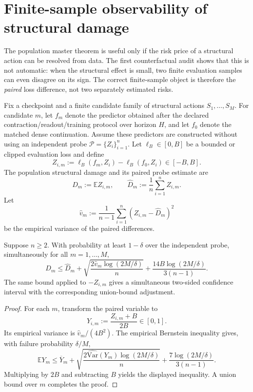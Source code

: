 \section{Finite-sample observability of structural damage}
The population master theorem is useful only if the risk price of a structural action can be resolved from data. The first counterfactual audit shows that this is not automatic: when the structural effect is small, two finite evaluation samples can even disagree on its sign. The correct finite-sample object is therefore the \emph{paired} loss difference, not two separately estimated risks.

Fix a checkpoint and a finite candidate family of structural actions $S_1,\ldots,S_M$. For candidate $m$, let $f_m$ denote the predictor obtained after the declared contraction/readout/training protocol over horizon $H$, and let $f_0$ denote the matched dense continuation. Assume these predictors are constructed without using an independent probe $\mathcal P=\{Z_i\}_{i=1}^n$. Let $\ell_B\in[0,B]$ be a bounded or clipped evaluation loss and define
\[
Z_{i,m}:=\ell_B(f_m,Z_i)-\ell_B(f_0,Z_i)\in[-B,B].
\]
The population structural damage and its paired probe estimate are
\[
D_m:=\mathbb E Z_{i,m},
\qquad
\widehat D_m:=\frac1n\sum_{i=1}^n Z_{i,m}.
\]
Let
\[
\widehat v_m:=\frac1{n-1}\sum_{i=1}^n(Z_{i,m}-\widehat D_m)^2
\]
be the empirical variance of the paired differences.

\begin{theorem}\label{thm:paired-damage}
Suppose $n\ge2$. With probability at least $1-\delta$ over the independent probe, simultaneously for all $m=1,\ldots,M$,
\[
\boxed{
D_m
\le
\widehat D_m
+
\sqrt{\frac{2\widehat v_m\log(2M/\delta)}{n}}
+
\frac{14B\log(2M/\delta)}{3(n-1)}.
}
\]
The same bound applied to $-Z_{i,m}$ gives a simultaneous two-sided confidence interval with the corresponding union-bound adjustment.
\end{theorem}

\begin{proof}
For each $m$, transform the paired variable to
\[
Y_{i,m}:=\frac{Z_{i,m}+B}{2B}\in[0,1].
\]
Its empirical variance is $\widehat v_m/(4B^2)$. The empirical Bernstein inequality gives, with failure probability $\delta/M$,
\[
\mathbb E Y_m
\le
\overline Y_m
+
\sqrt{\frac{2\widehat{\mathrm{Var}}(Y_m)\log(2M/\delta)}{n}}
+
\frac{7\log(2M/\delta)}{3(n-1)}.
\]
Multiplying by $2B$ and subtracting $B$ yields the displayed inequality. A union bound over $m$ completes the proof.
\end{proof}

